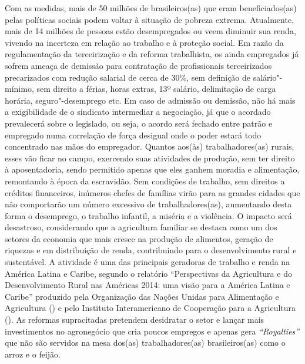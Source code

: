 Com as medidas, mais de 50 milhões de brasileiros(as) que eram
beneficiados(as) pelas políticas sociais podem voltar à situação de
pobreza extrema. Atualmente, mais de 14 milhões de pessoas estão
desempregados ou veem diminuir sua renda, vivendo na incerteza em
relação ao trabalho e à proteção social. Em razão da regulamentação da
terceirização e da reforma trabalhista, os ainda empregados já sofrem
ameaça de demissão para contratação de profissionais terceirizados
precarizados com redução salarial de cerca de 30\%, sem definição de
salário"-mínimo, sem direito a férias, horas extras, 13º salário,
delimitação de carga horária, seguro"-desemprego etc. Em caso de admissão
ou demissão, não há mais a exigibilidade de o sindicato intermediar a
negociação, já que o acordado prevalecerá sobre o legislado, ou seja, o
acordo será fechado entre patrão e empregado numa correlação de força
desigual onde o poder estará todo concentrado nas mãos do empregador.
Quantos aos(às) trabalhadores(as) rurais, esses vão ficar no campo,
exercendo suas atividades de produção, sem ter direito à aposentadoria,
sendo permitido apenas que eles ganhem moradia e alimentação, remontando
à época da escravidão. Sem condições de trabalho, sem direitos a
créditos financeiros, inúmeros chefes de famílias virão para as grandes
cidades que não comportarão um número excessivo de trabalhadores(as),
aumentando desta forma o desemprego, o trabalho infantil, a miséria e a
violência. O impacto será desastroso, considerando que a agricultura
familiar se destaca como um dos setores da economia que mais cresce na
produção de alimentos, geração de riquezas e em distribuição de renda,
contribuindo para o desenvolvimento rural e sustentável. A atividade é
uma das principais geradoras de trabalho e renda na América Latina e
Caribe, segundo o relatório ``Perspectivas da Agricultura e do
Desenvolvimento Rural nas Américas 2014: uma visão para a América Latina
e Caribe'' produzido pela Organização das Nações Unidas para Alimentação
e Agricultura () e pelo Instituto Interamericano de Cooperação para a
Agricultura (). As reformas supracitadas pretendem desidratar o
setor e lançar mais investimentos no agronegócio que cria poucos
empregos e apenas gera \emph{``Royalties''} que não são servidos na mesa
dos(as) trabalhadores(as) brasileiros(as) como o arroz e o feijão.

